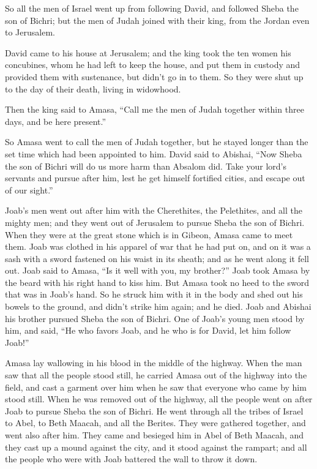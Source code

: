  So all the men of Israel went up from following David,
and followed Sheba the son of Bichri; but the men of Judah joined with
their king, from the Jordan even to Jerusalem.

 David came to his house at Jerusalem; and the king took
the ten women his concubines, whom he had left to keep the house, and
put them in custody and provided them with sustenance, but didn't go in
to them. So they were shut up to the day of their death, living in
widowhood.

 Then the king said to Amasa, ``Call me the men of Judah
together within three days, and be here present.''

 So Amasa went to call the men of Judah together, but he
stayed longer than the set time which had been appointed to him.
 David said to Abishai, ``Now Sheba the son of Bichri will
do us more harm than Absalom did. Take your lord's servants and pursue
after him, lest he get himself fortified cities, and escape out of our
sight.''

 Joab's men went out after him with the Cherethites, the
Pelethites, and all the mighty men; and they went out of Jerusalem to
pursue Sheba the son of Bichri.  When they were at the
great stone which is in Gibeon, Amasa came to meet them. Joab was
clothed in his apparel of war that he had put on, and on it was a sash
with a sword fastened on his waist in its sheath; and as he went along
it fell out.  Joab said to Amasa, ``Is it well with you,
my brother?'' Joab took Amasa by the beard with his right hand to kiss
him.  But Amasa took no heed to the sword that was in
Joab's hand. So he struck him with it in the body and shed out his
bowels to the ground, and didn't strike him again; and he died. Joab and
Abishai his brother pursued Sheba the son of Bichri.  One
of Joab's young men stood by him, and said, ``He who favors Joab, and he
who is for David, let him follow Joab!''

 Amasa lay wallowing in his blood in the middle of the
highway. When the man saw that all the people stood still, he carried
Amasa out of the highway into the field, and cast a garment over him
when he saw that everyone who came by him stood still. 
When he was removed out of the highway, all the people went on after
Joab to pursue Sheba the son of Bichri.  He went through
all the tribes of Israel to Abel, to Beth Maacah, and all the Berites.
They were gathered together, and went also after him. 
They came and besieged him in Abel of Beth Maacah, and they cast up a
mound against the city, and it stood against the rampart; and all the
people who were with Joab battered the wall to throw it down.

